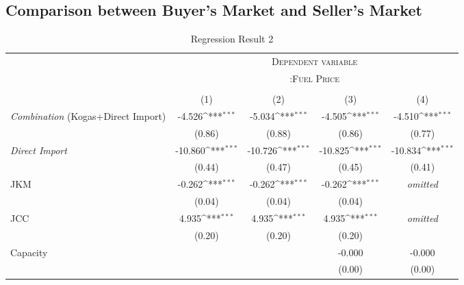 \documentclass[leqno]{article}
\begin{document}
\newpage
\subsection{Comparison between Buyer's Market and Seller's Market}


\begin{table}[h]\centering
\def\sym#1{\ifmmode^{#1}\else\(^{#1}\)\fi}
\caption{Regression Result 2\label{tab1}}
\begin{tabular}{l*{4}{c}}
\toprule
 & \multicolumn{4}{c}{\textsc{Dependent variable}} \\ 
                     &\multicolumn{4}{c}{\textsc{:Fuel Price}}\\
                                          \cline{2-5}  \\
                    &\multicolumn{1}{c}{(1)}&\multicolumn{1}{c}{(2)}&\multicolumn{1}{c}{(3)}&\multicolumn{1}{c}{(4)}\\
\hline \hline
\addlinespace
\textit{Combination} \small{(Kogas+Direct Import)}          &      -4.526\sym{***}&      -5.034\sym{***}&      -4.505\sym{***}&      -4.510\sym{***}\\
                    &      (0.86)         &      (0.88)         &      (0.86)         &      (0.77)         \\
\addlinespace
\textit{Direct Import}        &     -10.860\sym{***}&     -10.726\sym{***}&     -10.825\sym{***}&     -10.834\sym{***}\\
                    &      (0.44)         &      (0.47)         &      (0.45)         &      (0.41)         \\
\addlinespace
JKM                 &      -0.262\sym{***}&      -0.262\sym{***}&      -0.262\sym{***}&       \textit{omitted}         \\
                    &      (0.04)         &      (0.04)         &      (0.04)         &                  \\
\addlinespace
JCC                 &       4.935\sym{***}&       4.935\sym{***}&       4.935\sym{***}&       \textit{omitted}         \\
                    &      (0.20)         &      (0.20)         &      (0.20)         &                  \\
\addlinespace
Capacity            &                     &                     &      -0.000         &      -0.000         \\
                    &                     &                     &      (0.00)         &      (0.00)         \\

\end{tabular}
\end{table}
\end{document}
